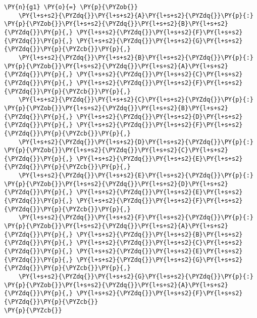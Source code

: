 \documentclass[12pt]{book}
\begin{document}
    \begin{tcolorbox}[breakable, size=fbox, boxrule=1pt, pad at break*=1mm,colback=cellbackground, colframe=cellborder]
\begin{Verbatim}[commandchars=\\\{\}]
\PY{n}{g1} \PY{o}{=} \PY{p}{\PYZob{}}
    \PY{l+s+s2}{\PYZdq{}}\PY{l+s+s2}{A}\PY{l+s+s2}{\PYZdq{}}\PY{p}{:} \PY{p}{\PYZob{}}\PY{l+s+s2}{\PYZdq{}}\PY{l+s+s2}{B}\PY{l+s+s2}{\PYZdq{}}\PY{p}{,} \PY{l+s+s2}{\PYZdq{}}\PY{l+s+s2}{F}\PY{l+s+s2}{\PYZdq{}}\PY{p}{,} \PY{l+s+s2}{\PYZdq{}}\PY{l+s+s2}{G}\PY{l+s+s2}{\PYZdq{}}\PY{p}{\PYZcb{}}\PY{p}{,}
    \PY{l+s+s2}{\PYZdq{}}\PY{l+s+s2}{B}\PY{l+s+s2}{\PYZdq{}}\PY{p}{:} \PY{p}{\PYZob{}}\PY{l+s+s2}{\PYZdq{}}\PY{l+s+s2}{A}\PY{l+s+s2}{\PYZdq{}}\PY{p}{,} \PY{l+s+s2}{\PYZdq{}}\PY{l+s+s2}{C}\PY{l+s+s2}{\PYZdq{}}\PY{p}{,} \PY{l+s+s2}{\PYZdq{}}\PY{l+s+s2}{F}\PY{l+s+s2}{\PYZdq{}}\PY{p}{\PYZcb{}}\PY{p}{,}
    \PY{l+s+s2}{\PYZdq{}}\PY{l+s+s2}{C}\PY{l+s+s2}{\PYZdq{}}\PY{p}{:} \PY{p}{\PYZob{}}\PY{l+s+s2}{\PYZdq{}}\PY{l+s+s2}{B}\PY{l+s+s2}{\PYZdq{}}\PY{p}{,} \PY{l+s+s2}{\PYZdq{}}\PY{l+s+s2}{D}\PY{l+s+s2}{\PYZdq{}}\PY{p}{,} \PY{l+s+s2}{\PYZdq{}}\PY{l+s+s2}{F}\PY{l+s+s2}{\PYZdq{}}\PY{p}{\PYZcb{}}\PY{p}{,}
    \PY{l+s+s2}{\PYZdq{}}\PY{l+s+s2}{D}\PY{l+s+s2}{\PYZdq{}}\PY{p}{:} \PY{p}{\PYZob{}}\PY{l+s+s2}{\PYZdq{}}\PY{l+s+s2}{C}\PY{l+s+s2}{\PYZdq{}}\PY{p}{,} \PY{l+s+s2}{\PYZdq{}}\PY{l+s+s2}{E}\PY{l+s+s2}{\PYZdq{}}\PY{p}{\PYZcb{}}\PY{p}{,}
    \PY{l+s+s2}{\PYZdq{}}\PY{l+s+s2}{E}\PY{l+s+s2}{\PYZdq{}}\PY{p}{:} \PY{p}{\PYZob{}}\PY{l+s+s2}{\PYZdq{}}\PY{l+s+s2}{D}\PY{l+s+s2}{\PYZdq{}}\PY{p}{,} \PY{l+s+s2}{\PYZdq{}}\PY{l+s+s2}{E}\PY{l+s+s2}{\PYZdq{}}\PY{p}{,} \PY{l+s+s2}{\PYZdq{}}\PY{l+s+s2}{F}\PY{l+s+s2}{\PYZdq{}}\PY{p}{\PYZcb{}}\PY{p}{,}
    \PY{l+s+s2}{\PYZdq{}}\PY{l+s+s2}{F}\PY{l+s+s2}{\PYZdq{}}\PY{p}{:} \PY{p}{\PYZob{}}\PY{l+s+s2}{\PYZdq{}}\PY{l+s+s2}{A}\PY{l+s+s2}{\PYZdq{}}\PY{p}{,} \PY{l+s+s2}{\PYZdq{}}\PY{l+s+s2}{B}\PY{l+s+s2}{\PYZdq{}}\PY{p}{,} \PY{l+s+s2}{\PYZdq{}}\PY{l+s+s2}{C}\PY{l+s+s2}{\PYZdq{}}\PY{p}{,} \PY{l+s+s2}{\PYZdq{}}\PY{l+s+s2}{E}\PY{l+s+s2}{\PYZdq{}}\PY{p}{,} \PY{l+s+s2}{\PYZdq{}}\PY{l+s+s2}{G}\PY{l+s+s2}{\PYZdq{}}\PY{p}{\PYZcb{}}\PY{p}{,}
    \PY{l+s+s2}{\PYZdq{}}\PY{l+s+s2}{G}\PY{l+s+s2}{\PYZdq{}}\PY{p}{:} \PY{p}{\PYZob{}}\PY{l+s+s2}{\PYZdq{}}\PY{l+s+s2}{A}\PY{l+s+s2}{\PYZdq{}}\PY{p}{,} \PY{l+s+s2}{\PYZdq{}}\PY{l+s+s2}{F}\PY{l+s+s2}{\PYZdq{}}\PY{p}{\PYZcb{}}
\PY{p}{\PYZcb{}}
\end{Verbatim}
\end{tcolorbox}
\end{document}
